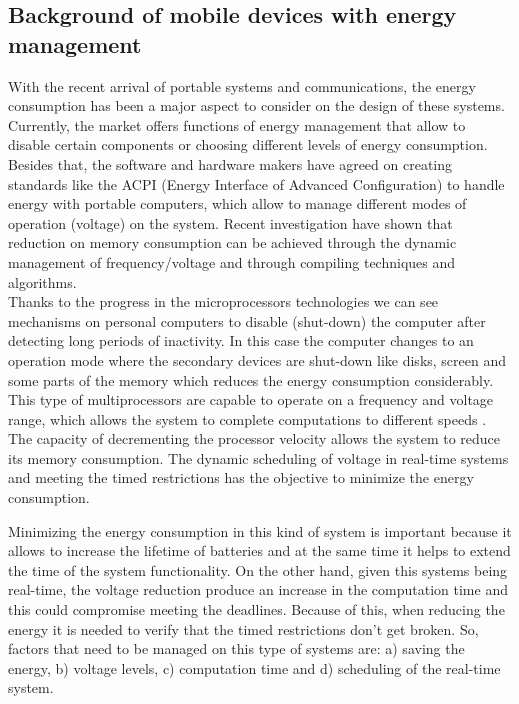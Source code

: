 \documentclass[conference]{IEEEtran}
\begin{document}
 \subsection{Background of mobile devices with energy management}

 With the recent arrival of portable systems and communications, the energy consumption has been a major aspect to consider on the design of these systems. Currently, the market offers functions of energy management that allow to disable certain components or choosing different levels of energy consumption. Besides that, the software and hardware makers have agreed on creating standards like the ACPI (Energy Interface of Advanced Configuration) to handle energy with portable computers, which allow to manage different modes of operation (voltage) on the system. Recent investigation have shown that reduction on memory consumption can be achieved through the dynamic management of frequency/voltage and through compiling techniques and algorithms. \cite{MARGI01} \\
 
 Thanks to the progress in the microprocessors technologies we can see mechanisms on personal computers to disable (shut-down) the computer after detecting long periods of inactivity. In this case the computer changes to an operation mode where the secondary devices are shut-down like disks, screen and some parts of the memory which reduces the energy consumption considerably. This type of multiprocessors are capable to operate on a frequency and voltage range, which allows the system to complete computations to different speeds \cite{PADM01}. The capacity of decrementing the processor velocity allows the system to reduce its memory consumption. The dynamic scheduling of voltage in real-time systems and meeting the timed restrictions has the objective to minimize the energy consumption.

 Minimizing the energy consumption in this kind of system is important because it allows to increase the lifetime of batteries and at the same time it helps to extend the time of the system functionality. On the other hand, given this systems being real-time, the voltage reduction produce an increase in the computation time and this could compromise meeting the deadlines. Because of this, when reducing the energy it is needed to verify that the timed restrictions don't get broken. So, factors that need to be managed on this type of systems are: a) saving the energy, b) voltage levels, c) computation time and d) scheduling of the real-time system.
 
\end{document}
